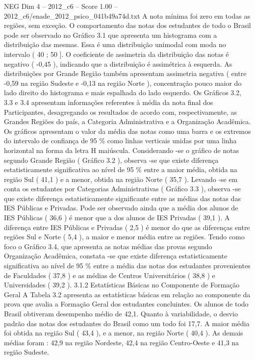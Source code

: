 \begin{textsample}{NEG Dim 4 – 2012\_c6 – Score 1.00 – 2012\_c6/enade\_2012\_psico\_041b49a74d.txt}
A nota mínima foi zero em todas as regiões, sem exceção.
O comportamento das notas dos estudantes de todo o Brasil pode ser observado no Gráfico 3.1 que apresenta um histograma com a distribuição das mesmas.
Essa é uma distribuição unimodal com moda no intervalo ( 40 ; 50 ].
O coeficiente de assimetria da distribuição das notas é negativo ( -0,45 ), indicando que a distribuição é assimétrica à esquerda.
As distribuições por Grande Região também apresentam assimetria negativa ( entre -0,59 na região Sudeste e -0,13 na região Norte ), concentração pouco maior do lado direito do histograma e mais espalhada do lado esquerdo.
Os Gráficos 3.2, 3.3 e 3.4 apresentam informações referentes à média da nota final dos Participantes, desagregando os resultados de acordo com, respectivamente, as Grandes Regiões do país, a Categoria Administrativa e a Organização Acadêmica.
Os gráficos apresentam o valor da média das notas como uma barra e os extremos do intervalo de confiança de 95 \% como linhas verticais unidas por uma linha horizontal na forma da letra H maiúscula.
Considerando -se o gráfico de notas segundo Grande Região ( Gráfico 3.2 ), observa -se que existe diferença estatisticamente significativa ao nível de 95 \% entre a maior média, obtida na região Sul ( 41,1 ) e a menor, obtida na região Norte ( 35,7 ).
Levando -se em conta os estudantes por Categorias Administrativas ( Gráfico 3.3 ), observa -se que existe diferença estatisticamente significante entre as médias das notas das IES Públicas e Privadas.
Pode ser observado ainda que a média dos alunos de IES Públicas ( 36,6 ) é menor que a dos alunos de IES Privadas ( 39,1 ).
A diferença entre IES Públicas e Privadas ( 2,5 ) é menor do que as diferenças entre regiões Sul e Norte ( 5,4 ), a maior e menor média entre as regiões.
Tendo como foco o Gráfico 3.4, que apresenta as notas médias das provas segundo Organização Acadêmica, constata -se que existe diferença estatisticamente significativa ao nível de 95 \% entre a média das notas dos estudantes provenientes de Faculdades ( 37,8 ) e as médias de Centros Universitários ( 38,8 ) e Universidades ( 39,2 ). 3.1.2 Estatísticas Básicas no Componente de Formação Geral A Tabela 3.2 apresenta as estatísticas básicas em relação ao componente da prova que avalia a Formação Geral dos estudantes concluintes.
Os alunos de todo Brasil obtiveram desempenho médio de 42,1.
Quanto à variabilidade, o desvio padrão das notas dos estudantes do Brasil como um todo foi 17,7.
A maior média foi obtida na região Sul ( 43,4 ), e a menor, na região Norte ( 40,4 ).
As demais médias foram : 42,9 na região Nordeste, 42,4 na região Centro-Oeste e 41,3 na região Sudeste.

\end{textsample}

